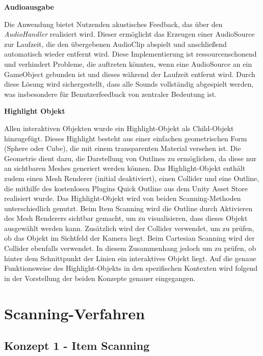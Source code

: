 {\normalfont \bfseries Audioausgabe}

Die Anwendung bietet Nutzenden akustisches Feedback, das über den \textit{AudioHandler} realisiert wird. Dieser ermöglicht das Erzeugen einer AudioSource zur Laufzeit, die den übergebenen AudioClip abspielt und anschließend automatisch wieder entfernt wird. Diese Implementierung ist ressourcenschonend und verhindert Probleme, die auftreten könnten, wenn eine AudioSource an ein GameObject gebunden ist und dieses während der Laufzeit entfernt wird. Durch diese Lösung wird sichergestellt, dass alle Sounds vollständig abgespielt werden, was insbesondere für Benutzerfeedback von zentraler Bedeutung ist.

{\normalfont \bfseries Highlight Objekt}

Allen interaktiven Objekten wurde ein Highlight-Objekt als Child-Objekt hinzugefügt. Dieses Highlight besteht aus einer einfachen geometrischen Form (Sphere oder Cube), die mit einem transparenten Material versehen ist. Die Geometrie dient dazu, die Darstellung von Outlines zu ermöglichen, da diese nur an sichtbaren Meshes generiert werden können. Das Highlight-Objekt enthält zudem einen Mesh Renderer (initial deaktiviert), einen Collider und eine Outline, die mithilfe des kostenlosen Plugins Quick Outline \citep{chris_nolet_quick_2022} aus dem Unity Asset Store realisiert wurde.
Das Highlight-Objekt wird von beiden Scanning-Methoden unterschiedlich genutzt. Beim Item Scanning wird die Outline durch Aktivieren des Mesh Renderers sichtbar gemacht, um zu visualisieren, dass dieses Objekt ausgewählt werden kann. Zusätzlich wird der Collider verwendet, um zu prüfen, ob das Objekt im Sichtfeld der Kamera liegt. Beim Cartesian Scanning wird der Collider ebenfalls verwendet. In diesem Zusammenhang jedoch um zu prüfen, ob hinter dem Schnittpunkt der Linien ein interaktives Objekt liegt. Auf die genaue Funktionsweise des Highlight-Objekts in den spezifischen Kontexten wird folgend in der Vorstellung der beiden Konzepte genauer eingegangen. 

\section{Scanning-Verfahren}

\subsection{Konzept 1 - Item Scanning }

